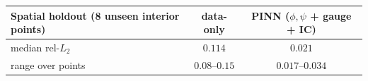 \begin{center}
\begin{tabular}{lcc}
\toprule
Spatial holdout (8 unseen interior points) & data-only & PINN ($\phi,\psi$ + gauge + IC) \\
\midrule
median rel-$L_2$ & $0.114$ & $\mathbf{0.021}$ \\
range over points & $0.08$--$0.15$ & $\mathbf{0.017}$--$\mathbf{0.034}$ \\
\bottomrule
\end{tabular}
\end{center}
